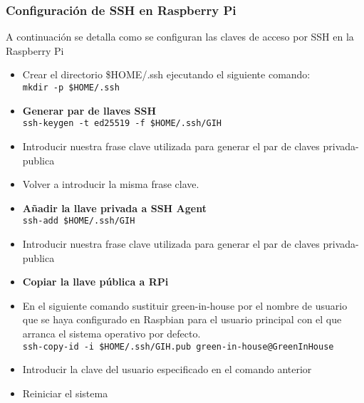         \subsubsection{Configuración de SSH en Raspberry Pi}
        A continuación se detalla como se configuran las claves de acceso por SSH en la Raspberry Pi
        \begin{itemize}
            \item Crear el directorio \$HOME/.ssh ejecutando el siguiente comando:
            \\ \texttt{mkdir -p \$HOME/.ssh}
            \item \textbf{Generar par de llaves SSH}
            \\ \texttt{ssh-keygen -t ed25519 -f \$HOME/.ssh/GIH}
            \item Introducir nuestra frase clave utilizada para generar el par de claves privada-publica
            \item Volver a introducir la misma frase clave.
            \item \textbf{Añadir la llave privada a SSH Agent}
            \\ \texttt{ssh-add \$HOME/.ssh/GIH}
            \item Introducir nuestra frase clave utilizada para generar el par de claves privada-publica
            \item \textbf{Copiar la llave pública a RPi}
            \item En el siguiente comando sustituir green-in-house por el nombre de usuario que se haya configurado en Raspbian para el usuario principal con el que arranca el sistema operativo por defecto.
            \\ \texttt{ssh-copy-id -i \$HOME/.ssh/GIH.pub green-in-house@GreenInHouse}
            \item Introducir la clave del usuario especificado en el comando anterior
            \item Reiniciar el sistema
        \end{itemize}
